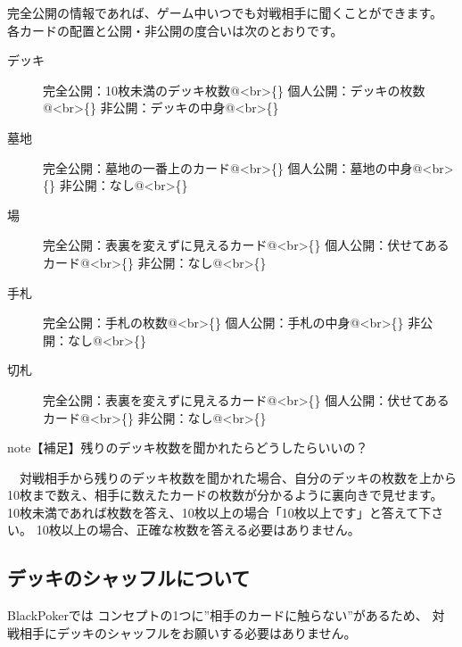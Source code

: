\documentclass[letterpaper,10pt,dvipdfmx]{sphinxmanual}
\begin{document}
完全公開の情報であれば、ゲーム中いつでも対戦相手に聞くことができます。
各カードの配置と公開・非公開の度合いは次のとおりです。
\begin{description}
\item[{デッキ}] \leavevmode
完全公開：10枚未満のデッキ枚数@\textless{}br\textgreater{}\{\}
個人公開：デッキの枚数@\textless{}br\textgreater{}\{\}
非公開：デッキの中身@\textless{}br\textgreater{}\{\}

\item[{墓地}] \leavevmode
完全公開：墓地の一番上のカード@\textless{}br\textgreater{}\{\}
個人公開：墓地の中身@\textless{}br\textgreater{}\{\}
非公開：なし@\textless{}br\textgreater{}\{\}

\item[{場}] \leavevmode
完全公開：表裏を変えずに見えるカード@\textless{}br\textgreater{}\{\}
個人公開：伏せてあるカード@\textless{}br\textgreater{}\{\}
非公開：なし@\textless{}br\textgreater{}\{\}

\item[{手札}] \leavevmode
完全公開：手札の枚数@\textless{}br\textgreater{}\{\}
個人公開：手札の中身@\textless{}br\textgreater{}\{\}
非公開：なし@\textless{}br\textgreater{}\{\}

\item[{切札}] \leavevmode
完全公開：表裏を変えずに見えるカード@\textless{}br\textgreater{}\{\}
個人公開：伏せてあるカード@\textless{}br\textgreater{}\{\}
非公開：なし@\textless{}br\textgreater{}\{\}

\end{description}

\begin{sphinxadmonition}{note}{【補足】残りのデッキ枚数を聞かれたらどうしたらいいの？}

　対戦相手から残りのデッキ枚数を聞かれた場合、自分のデッキの枚数を上から10枚まで数え、相手に数えたカードの枚数が分かるように裏向きで見せます。
10枚未満であれば枚数を答え、10枚以上の場合「10枚以上です」と答えて下さい。
10枚以上の場合、正確な枚数を答える必要はありません。
\end{sphinxadmonition}


\subsection{デッキのシャッフルについて}
\label{\detokenize{common/07-etc:id3}}
BlackPokerでは
コンセプトの1つに”相手のカードに触らない”があるため、
対戦相手にデッキのシャッフルをお願いする必要はありません。
\end{document}
